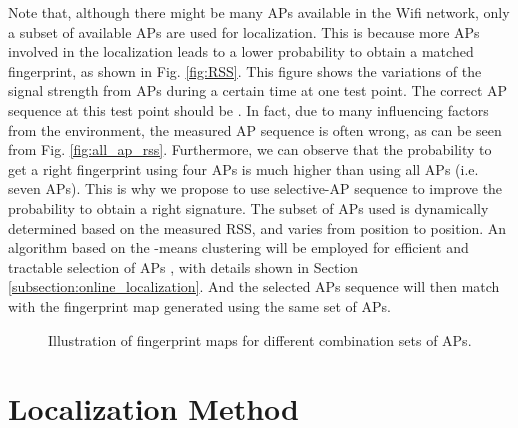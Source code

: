 \documentclass[10pt, conference, letterpaper]{IEEEtran}
\begin{document}
Note that, although there might be many APs available in the Wifi network, only a subset of available APs are used for localization. 
This is because more APs involved in the localization leads to a lower probability to obtain a matched fingerprint, as shown in Fig. \ref{fig:RSS}. 
This figure shows the variations of the signal strength from APs during a certain time at one test point. 
The correct AP sequence at this test point should be . 
In fact, due to many influencing factors from the environment, the measured AP sequence is often wrong, as can be seen from Fig. \ref{fig:all_ap_rss}.
Furthermore, we can observe that the probability to get a right fingerprint using four APs is much higher than using all APs (i.e. seven APs).
This is why we propose to use selective-AP sequence to improve the probability to obtain a right signature. 
The subset of APs used is dynamically determined based on the measured RSS, and varies from position to position. 
An algorithm based on the -means clustering will be employed for efficient and tractable selection of APs \cite{Kmeans}, 
with details shown in Section \ref{subsection:online_localization}. 
And the selected APs sequence will then match with the fingerprint map generated using the same set of APs. 

\begin{figure*}
  \centering
   \caption[AP fingerprint model.]
{Illustration of fingerprint maps for different combination sets of APs.}
\label{fig:AP_fingerpringting_model}
\vspace{-0.2in}
\end{figure*}

\section{Localization Method}
\label{section:localization_method}
\end{document}
